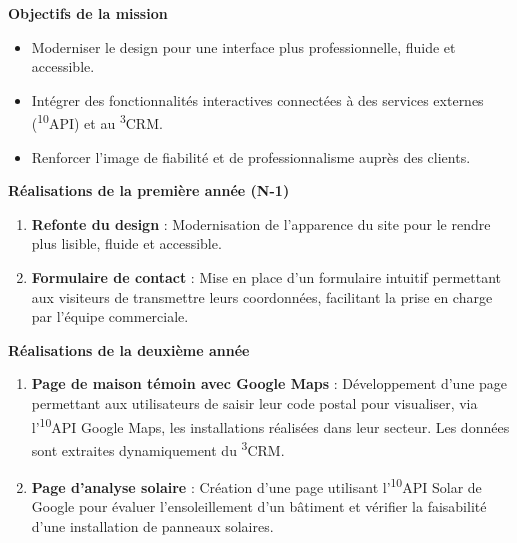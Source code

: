 \textbf{Objectifs de la mission}\vspace{0.3cm}

\begin{itemize}
    \item Moderniser le design pour une interface plus professionnelle, fluide et accessible.\vspace{0.3cm}
    \item Intégrer des fonctionnalités interactives connectées à des services externes (\textsuperscript{10}API) et au \textsuperscript{3}CRM.\vspace{0.3cm}
    \item Renforcer l’image de fiabilité et de professionnalisme auprès des clients.\vspace{0.3cm}
\end{itemize}

\textbf{Réalisations de la première année (N-1)}\vspace{0.3cm}

\begin{enumerate}
    \item \textbf{Refonte du design} : Modernisation de l’apparence du site pour le rendre plus lisible, fluide et accessible.\vspace{0.3cm}
    \item \textbf{Formulaire de contact} : Mise en place d’un formulaire intuitif permettant aux visiteurs de transmettre leurs coordonnées, facilitant la prise en charge par l’équipe commerciale.\vspace{0.3cm}
\end{enumerate}

\textbf{Réalisations de la deuxième année}\vspace{0.3cm}

\begin{enumerate}
    \item \textbf{Page de maison témoin avec Google Maps} : Développement d’une page permettant aux utilisateurs de saisir leur code postal pour visualiser, via l’\textsuperscript{10}API Google Maps, les installations réalisées dans leur secteur. Les données sont extraites dynamiquement du \textsuperscript{3}CRM.\vspace{0.3cm}
    \item \textbf{Page d’analyse solaire} : Création d’une page utilisant l’\textsuperscript{10}API Solar de Google pour évaluer l’ensoleillement d’un bâtiment et vérifier la faisabilité d’une installation de panneaux solaires.\vspace{0.3cm}
\end{enumerate}

